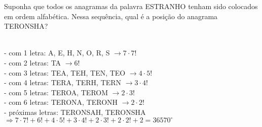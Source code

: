 \begin{ex}
Suponha que todos os anagramas da palavra ESTRANHO  tenham sido colocados em ordem alfabética. Nessa sequência, qual é a posição do anagrama TERONSHA?
  \begin{sol}
    \phantom{A} \\
    - com 1 letra: A, E, H, N, O, R, S $\rightarrow 7\cdot7!$ \\
    - com 2 letras: TA $\rightarrow 6!$ \\
    - com 3 letras: TEA, TEH, TEN, TEO $\rightarrow 4\cdot5!$  \\
    - com 4 letras:  TERA, TERH, TERN $\rightarrow 3\cdot4! $  \\
    - com 5 letras: TEROA, TEROM $\rightarrow 2\cdot3!$  \\
    - com 6 letras: TERONA, TERONH $\rightarrow 2\cdot2!$  \\
    - próximas letras: TERONSAH, TERONSHA \\
    $\Longrightarrow 7\cdot7!+6!+4\cdot5!+3\cdot4!+2\cdot3!+2\cdot2!+2=36570^{\circ}$
    
    
  \end{sol}
\end{ex}